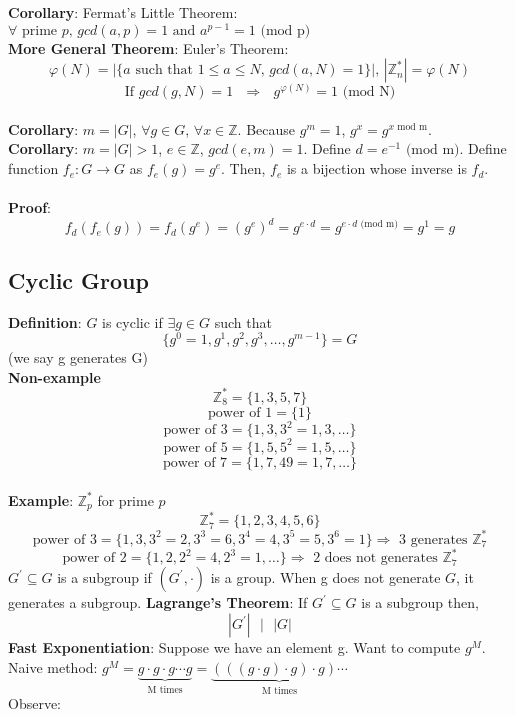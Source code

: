\documentclass{scribe}
\begin{document}
\noindent\textbf{Corollary}: Fermat's Little Theorem: $\forall \text{ prime } p \text{, } gcd(a,p)=1 \text{ and } a^{p-1} = 1 \text{ (mod p)}$
\vspace{3mm}
\\\noindent\textbf{More General Theorem}: Euler's Theorem:
\[\varphi(N) = |\{a \text{ such that } 1 \le a \le N \text{,  } gcd(a,N) =1\}| \text{,  } |\mathbb{Z}_n^{*}| = \varphi(N)\]
\[\text{If } gcd(g,N) = 1 \text{  }\Rightarrow\text{  } g^{\varphi(N)} = 1 \text{ (mod N)}\]
\vspace{3mm}
\\\noindent\textbf{Corollary}: $m=|G|$, $\forall g \in G$, $\forall x \in \mathbb{Z}$. Because $g^m = 1$, $g^x = g^{x \text{ mod m}}$.
\vspace{3mm}
\\\noindent\textbf{Corollary}: $m = |G| > 1$, $e \in \mathbb{Z}$, $gcd(e,m) =1$. Define $d=e^{-1} \text{ (mod m)}$. Define function $f_e:G \rightarrow G$ as $f_e(g) = g^e$. Then, $f_e$ is a bijection whose inverse is $f_d$.
\\\\\noindent\textbf{Proof}:
\[f_d(f_e(g)) = f_d(g^e) = (g^e)^d = g^{e \cdot d} = g ^{e \cdot d \text{ (mod m)}} = g^{1} = g\]
\vspace{8mm}
\subsection{Cyclic Group}
\textbf{Definition}: $G$ is cyclic if $\exists g \in G$ such that
\[\{g^0=1, g^1, g^2,g^3, \dots, g^{m-1}\} = G\] (we say g generates G)
\vspace{3mm}
\\\noindent\textbf{Non-example}
\[\mathbb{Z}_8^{*}=\{1,3,5,7\}\]
\[\text{power of } 1=\{1\}\]
\[\text{power of } 3=\{1, 3, 3^2 = 1, 3, \dots\}\]
\[\text{power of } 5=\{1, 5, 5^2 = 1, 5, \dots \}\]
\[\text{power of } 7=\{1, 7, 49=1, 7, \dots\}\]
\\\noindent\textbf{Example}: $\mathbb{Z}_p^{*}$ for prime $p$
\[\mathbb{Z}_7^{*}=\{1,2,3,4,5,6\}\]
\[\text{power of } 3=\{1, 3, 3^2 = 2, 3^3 = 6, 3^4 = 4, 3^5 = 5, 3^6 = 1\} \Rightarrow \text{ 3 generates }\mathbb{Z}_7^{*}\]
\[\text{power of } 2=\{1, 2, 2^2 = 4, 2^3 = 1, \dots \} \Rightarrow \text{ 2 does not generates }\mathbb{Z}_7^{*}\]
$G^{'} \subseteq G$ is a subgroup if $(G^{'}, \cdot )$ is a group. When g does not generate $G$, it generates a subgroup.
\textbf{Lagrange's Theorem}: If $G^{'} \subseteq G$ is a subgroup then,
\[|G^{'}| \text{ } \bigg| \text{ } |G|\]
\vspace{3mm}
\textbf{Fast Exponentiation}: Suppose we have an element g. Want to compute $g^M$.
\\Naive method: $g^{M} = \underbrace{g \cdot g \cdot g \cdots g}_{\text{M times}} = \underbrace{(((g \cdot g) \cdot g) \cdot g) \cdots}_{\text{M times}} $ %
\\Observe:
\end{document}
